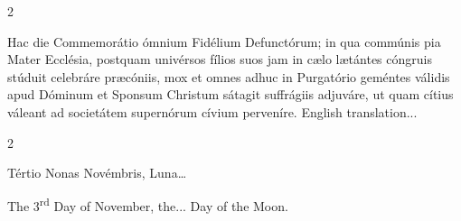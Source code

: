 \begin{paracol}{2}
\switchcolumn
{}
\switchcolumn*

Hac die Commemorátio ómnium Fidélium Defunctórum; in qua commúnis pia Mater
Ecclésia, postquam univérsos fílios suos jam in cælo lætántes cóngruis stúduit
celebráre præcóniis, mox et omnes adhuc in Purgatório geméntes válidis apud
Dóminum et Sponsum Christum sátagit suffrágiis adjuváre, ut quam cítius váleant
ad societátem supernórum cívium perveníre.
\switchcolumn
{}
English translation...
\switchcolumn*

\switchcolumn
{}
\switchcolumn*

\end{paracol}


\begin{paracol}{2}
\begin{center}{\color{gregoriocolor}Tértio Nonas Novémbris, Luna\dots\ }\end{center}
\switchcolumn
{}
\begin{center}{\color{gregoriocolor}The 3\textsuperscript{rd} Day of 
 November, the... Day of the Moon.}\end{center}
\end{paracol}

